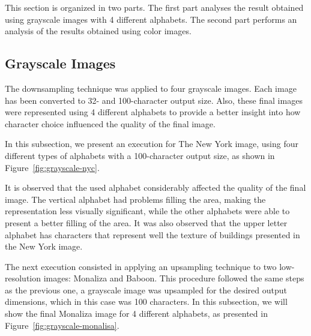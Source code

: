 \documentclass[]{IEEEtran}
\begin{document}
This section is organized in two parts. The first part analyses the result obtained using grayscale images with 4 different alphabets. The second part performs an analysis of the results obtained using color images.

\subsection{Grayscale Images}

The downsampling technique was applied to four grayscale images. Each image has been converted to 32- and 100-character output size. Also, these final images were represented using 4 different alphabets to provide a better insight into how character choice influenced the quality of the final image.

In this subsection, we present an execution for The New York image, using four different types of alphabets with a 100-character output size, as shown in Figure~\ref{fig:grayscale-nyc}.


It is observed that the used alphabet considerably affected the quality of the final image. The vertical alphabet had problems filling the area, making the representation less visually significant, while the other alphabets were able to present a better filling of the area. It was also observed that the upper letter alphabet has characters that represent well the texture of buildings presented in the New York image.

The next execution consisted in applying an upsampling technique to two low-resolution images: Monaliza and Baboon. This procedure followed the same steps as the previous one, a grayscale image was upsampled for the desired output dimensions, which in this case was 100 characters. In this subsection, we will show the final Monaliza image for 4 different alphabets, as presented in Figure~\ref{fig:grayscale-monalisa}.
\end{document}
